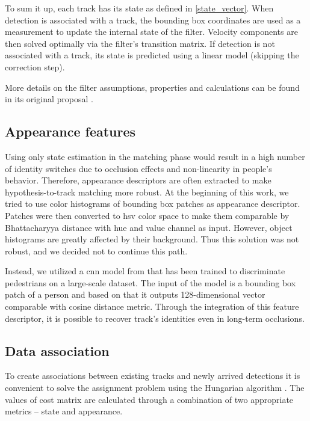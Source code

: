         To sum it up, each track has its state as defined in \ref{state_vector}. When detection is associated with a track, the bounding box coordinates are used as a measurement to update the internal state of the filter. Velocity components are then solved optimally via the filter's transition matrix. If detection is not associated with a track, its state is predicted using a linear model (skipping the correction step). 
        
        More details on the filter assumptions, properties and calculations can be found in its original proposal \cite{kalman1960new}.

    \subsection{Appearance features}\label{appearance_features}
        Using only state estimation in the matching phase would result in a high number of identity switches due to occlusion effects and non-linearity in people's behavior. Therefore, appearance descriptors are often extracted to make hypothesis-to-track matching more robust. At the beginning of this work, we tried to use color histograms of bounding box patches as appearance descriptor. Patches were then converted to \gls{hsv} color space to make them comparable by Bhattacharyya distance \cite{choi2003feature} with hue and value channel as input. However, object histograms are greatly affected by their background. Thus this solution was not robust, and we decided not to continue this path.
        
        Instead, we utilized a \gls{cnn} model from \cite{wojke2017simple} that has been trained to discriminate pedestrians on a large-scale dataset. The input of the model is a bounding box patch of a person and based on that it outputs 128-dimensional vector comparable with cosine distance metric. Through the integration of this feature descriptor, it is possible to recover track's identities even in long-term occlusions.

    \subsection{Data association}
        To create associations between existing tracks and newly arrived detections it is convenient to solve the assignment problem using the Hungarian algorithm \cite{jonker1987shortest}. The values of cost matrix are calculated through a combination of two appropriate metrics -- state and appearance. 
        
